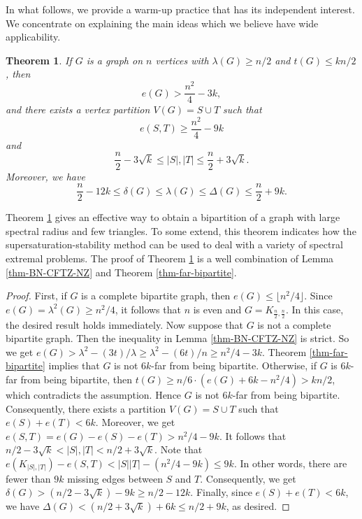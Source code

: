 \documentclass[11pt]{article}
\newtheorem{theorem}{Theorem}[section]
\begin{document}
In what follows, we provide a warm-up practice    
that has its independent interest. 
We concentrate on explaining the main ideas which we 
believe have wide applicability.  


\begin{theorem} \label{thm-tri-effi}
If $G$ is a graph on $n$ vertices with 
$\lambda (G)\ge n/2$ and $t(G)\le kn/2$, then 
\[ e(G)> \frac{n^2}{4} - 3k,  \] 
 and there exists a vertex partition 
 $V(G)=S\cup T$ such that 
 \[  e(S,T)\ge \frac{n^2}{4} -9k \] 
  and 
 \[ \frac{n}{2} - 3\sqrt{k} \le |S|, |T| \le  \frac{n}{2} + 3\sqrt{k}. \]  
 Moreover, we have 
 \[   \frac{n}{2} -12 k \le \delta (G)\le 
 \lambda (G)\le \Delta (G) \le  
  \frac{n}{2} + 9k . \] 
\end{theorem}

Theorem \ref{thm-tri-effi} 
gives an effective way to obtain a bipartition of a graph with large spectral radius and few triangles.  To some extend, 
this theorem indicates how the supersaturation-stability method 
can be used to deal with a variety of spectral extremal problems.  
The proof of Theorem \ref{thm-tri-effi}  is a well combination of 
Lemma \ref{thm-BN-CFTZ-NZ} and Theorem 
\ref{thm-far-bipartite}. 




\begin{proof} 
 First, if $G$ is a complete bipartite graph, 
then $e(G)\le \lfloor n^2/4\rfloor$. 
Since  $e(G)=\lambda^2(G) \ge n^2/4$,  
it follows that $n$ is even and $G=K_{\frac{n}{2}, \frac{n}{2}}$. In this case, 
 the desired result holds immediately.  
  Now suppose that $G$ is not a complete bipartite graph.  
Then the inequality in Lemma \ref{thm-BN-CFTZ-NZ} is strict.  So we get $e(G)> \lambda^2 - (3t)/ \lambda 
 \ge \lambda^2 - (6t)/n \ge n^2/4 -3k$. 
 Theorem \ref{thm-far-bipartite} implies that $G$ is not 
 $6k$-far from being bipartite. Otherwise, if $G$ is 
 $6k$-far from being bipartite, then $t(G)
 \ge {n}/{6}\cdot (e(G) + 6k - n^2/4) >   kn /2$, 
 which contradicts the assumption. 
 Hence $G$ is not $6k$-far from being bipartite. 
Consequently, there exists a partition $V(G)=S\cup T$ such that 
 $e(S) + e(T)< 6k$. Moreover, we get 
 $e(S,T)= e(G) - e(S) - e(T) > n^2/4 - 9k$. 
It follows that 
  $n/2 - 3\sqrt{k} < |S|, |T| < n/2 + 3\sqrt{k}$. 
Note that $e(K_{|S|,|T|}) - e(S,T) < |S| |T| - (n^2/4 - 9k) \le 9k$. 
In other words,  there are fewer than $9k$ missing edges between $S$ and $T$. Consequently, we get $\delta (G)>  
(n/2 - 3\sqrt{k}) - 9k \ge n/2- 12k$. 
Finally, since $e(S) + e(T)< 6k$, we have  
$\Delta (G)< (n/2 + 3\sqrt{k}) +6k \le n/2 +9k$, as desired. 
\end{proof}
\end{document}
